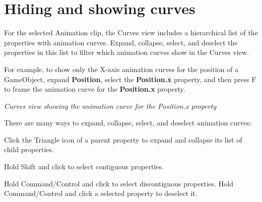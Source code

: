 \chapter{Hiding and showing curves}
\hypertarget{md__library_2_package_cache_2com_8unity_8timeline_0d1_87_86_2_documentation_0i_2crv__hide}{}\label{md__library_2_package_cache_2com_8unity_8timeline_0d1_87_86_2_documentation_0i_2crv__hide}
\label{md__library_2_package_cache_2com_8unity_8timeline_0d1_87_86_2_documentation_0i_2crv__hide_autotoc_md1135}%
%
 For the selected Animation clip, the Curves view includes a hierarchical list of the properties with animation curves. Expand, collapse, select, and deselect the properties in this list to filter which animation curves show in the Curves view.

For example, to show only the X-\/axis animation curves for the position of a Game\+Object, expand {\bfseries{Position}}, select the {\bfseries{Position.\+x}} property, and then press F to frame the animation curve for the {\bfseries{Position.\+x}} property.



{\itshape Curves view showing the animation curve for the Position.\+x property}

There are many ways to expand, collapse, select, and deselect animation curves\+:


\begin{DoxyItemize}
\item Click the Triangle icon of a parent property to expand and collapse its list of child properties.
\item Hold Shift and click to select contiguous properties.
\item Hold Command/\+Control and click to select discontiguous properties. Hold Command/\+Control and click a selected property to deselect it. 
\end{DoxyItemize}
